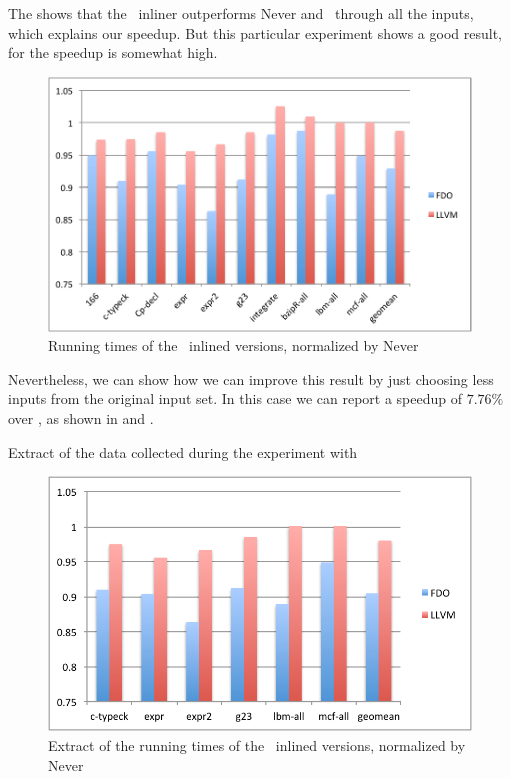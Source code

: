 The  shows that the \FDI\ inliner outperforms Never and \llvm\ through all the inputs, which explains our speedup. But this particular experiment shows a good result, for the speedup is somewhat high.

\begin{figure}
  \centering
  \includegraphics[width=1.00\linewidth]{Figures/speedupgcc}
  \caption{Running times of the \gcc\ inlined versions, normalized by Never}
  \label{fig:speedupgcc}
\end{figure}

Nevertheless, we can show how we can improve this result by just choosing less inputs from the original input set. In this case we can report a speedup of $7.76 \%$ over \llvm, as shown in  and .

\begin{table}
  \centering
  \begin{tiny}
  
  \end{tiny}
  \caption{Extract of the data collected during the experiment with \gcc}
  \label{tab:speedupgcc1}
\end{table}

\begin{figure}
  \centering
  \includegraphics[width=1.00\linewidth]{Figures/speedupgcc1}
  \caption{Extract of the running times of the \gcc\ inlined versions, normalized by Never}
  \label{fig:speedupgcc1}
\end{figure}


